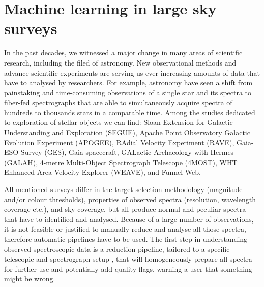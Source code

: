 \section{Machine learning in large sky surveys}
In the past decades, we witnessed a major change in many areas of scientific research, including the filed of astronomy. New observational methods and advance scientific experiments are serving us ever increasing amounts of data that have to analysed by researchers. For example, astronomy have seen a shift from painstaking and time-consuming observations of a single star and its spectra to fiber-fed spectrographs that are able to simultaneously acquire spectra of hundreds to thousands stars in a comparable time. Among the studies dedicated to exploration of stellar objects we can find: Sloan Extension for Galactic
Understanding and Exploration (SEGUE), Apache Point Observatory Galactic Evolution Experiment (APOGEE), RAdial Velocity Experiment (RAVE), Gaia-ESO Survey (GES), Gaia spacecraft, GALactic Archaeology with Hermes (GALAH), 4-metre Multi-Object Spectrograph Telescope (4MOST), WHT Enhanced Area Velocity Explorer (WEAVE), and Funnel Web.

All mentioned surveys differ in the target selection methodology (magnitude and/or colour thresholds), properties of observed spectra (resolution, wavelength coverage etc.), and sky coverage, but all produce normal and peculiar spectra that have to identified and analysed. Because of a large number of observations, it is not feasible or justified to manually reduce and analyse all those spectra, therefore automatic pipelines have to be used. The first step in understanding observed spectroscopic data is a reduction pipeline, tailored to a specific telescopic and spectrograph setup \cite{2017MNRAS.464.1259K, 2019arXiv191202905A, 2020arXiv200204377S}, that will homogeneously prepare all spectra for further use and potentially add quality flags, warning a user that something might be wrong.

